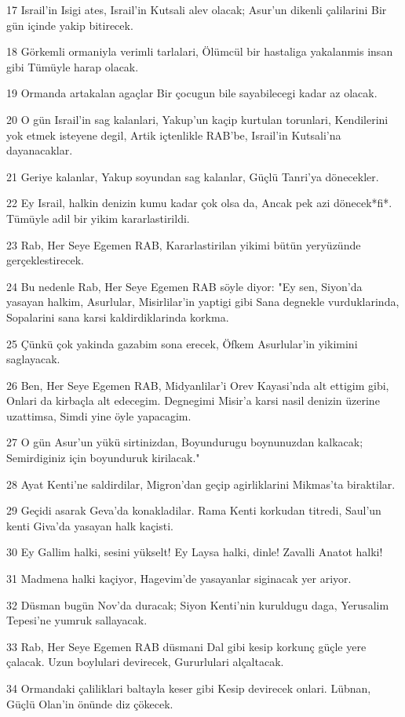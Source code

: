 \par 17 Israil'in Isigi ates, Israil'in Kutsali alev olacak; Asur'un dikenli çalilarini Bir gün içinde yakip bitirecek.
\par 18 Görkemli ormaniyla verimli tarlalari, Ölümcül bir hastaliga yakalanmis insan gibi Tümüyle harap olacak.
\par 19 Ormanda artakalan agaçlar Bir çocugun bile sayabilecegi kadar az olacak.
\par 20 O gün Israil'in sag kalanlari, Yakup'un kaçip kurtulan torunlari, Kendilerini yok etmek isteyene degil, Artik içtenlikle RAB'be, Israil'in Kutsali'na dayanacaklar.
\par 21 Geriye kalanlar, Yakup soyundan sag kalanlar, Güçlü Tanri'ya dönecekler.
\par 22 Ey Israil, halkin denizin kumu kadar çok olsa da, Ancak pek azi dönecek*fi*. Tümüyle adil bir yikim kararlastirildi.
\par 23 Rab, Her Seye Egemen RAB, Kararlastirilan yikimi bütün yeryüzünde gerçeklestirecek.
\par 24 Bu nedenle Rab, Her Seye Egemen RAB söyle diyor: "Ey sen, Siyon'da yasayan halkim, Asurlular, Misirlilar'in yaptigi gibi Sana degnekle vurduklarinda, Sopalarini sana karsi kaldirdiklarinda korkma.
\par 25 Çünkü çok yakinda gazabim sona erecek, Öfkem Asurlular'in yikimini saglayacak.
\par 26 Ben, Her Seye Egemen RAB, Midyanlilar'i Orev Kayasi'nda alt ettigim gibi, Onlari da kirbaçla alt edecegim. Degnegimi Misir'a karsi nasil denizin üzerine uzattimsa, Simdi yine öyle yapacagim.
\par 27 O gün Asur'un yükü sirtinizdan, Boyundurugu boynunuzdan kalkacak; Semirdiginiz için boyunduruk kirilacak."
\par 28 Ayat Kenti'ne saldirdilar, Migron'dan geçip agirliklarini Mikmas'ta biraktilar.
\par 29 Geçidi asarak Geva'da konakladilar. Rama Kenti korkudan titredi, Saul'un kenti Giva'da yasayan halk kaçisti.
\par 30 Ey Gallim halki, sesini yükselt! Ey Laysa halki, dinle! Zavalli Anatot halki!
\par 31 Madmena halki kaçiyor, Hagevim'de yasayanlar siginacak yer ariyor.
\par 32 Düsman bugün Nov'da duracak; Siyon Kenti'nin kuruldugu daga, Yerusalim Tepesi'ne yumruk sallayacak.
\par 33 Rab, Her Seye Egemen RAB düsmani Dal gibi kesip korkunç güçle yere çalacak. Uzun boylulari devirecek, Gururlulari alçaltacak.
\par 34 Ormandaki çaliliklari baltayla keser gibi Kesip devirecek onlari. Lübnan, Güçlü Olan'in önünde diz çökecek.

